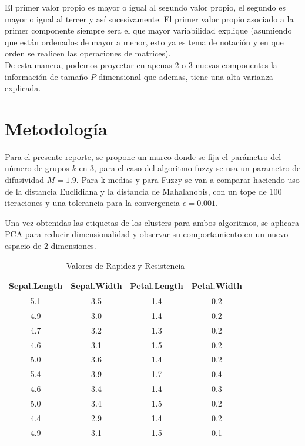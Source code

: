 \documentclass[11pt, letterpaper]{article}
\begin{document}
El primer valor propio es mayor o igual al segundo valor propio, el segundo es mayor o igual al tercer y así sucesivamente. El primer valor propio asociado a la primer componente siempre sera el que mayor variabilidad explique (asumiendo que están ordenados de mayor a menor, esto ya es tema de notación y en que orden se realicen las operaciones de matrices). \\

De esta manera, podemos proyectar en apenas 2 o 3 nuevas componentes la información de tamaño $P$ dimensional que ademas, tiene una alta varianza explicada.




\newpage

\section{Metodología}

Para el presente reporte, se propone un marco donde se fija el parámetro del número de grupos $k$ en 3, para el caso del algoritmo fuzzy se usa un parametro de difusividad $M = 1.9$. Para k-medias y para Fuzzy se van a comparar haciendo uso de la distancia Euclidiana y la distancia de Mahalanobis, con un tope de 100 iteraciones y una tolerancia para la convergencia $\epsilon = 0.001$.

Una vez obtenidas las etiquetas de los clusters para ambos algoritmos, se aplicara PCA para reducir dimensionalidad y observar su comportamiento en un nuevo espacio de 2 dimensiones.






\begin{table}[ht]
	\centering
	\begin{tabular}{cccc}
		\hline
\textbf{Sepal.Length} & \textbf{Sepal.Width} & \textbf{Petal.Length} & \textbf{Petal.Width} \\
		\hline

5.1          & 3.5         & 1.4          & 0.2 \\
4.9          & 3.0         & 1.4          & 0.2  \\        
4.7          & 3.2         & 1.3          & 0.2  \\       
4.6          & 3.1         & 1.5          & 0.2  \\       
5.0          & 3.6         & 1.4          & 0.2    \\     
5.4          & 3.9         & 1.7          & 0.4      \\     
4.6          & 3.4         & 1.4          & 0.3        \\   
5.0          & 3.4         & 1.5          & 0.2          \\ 
4.4          & 2.9         & 1.4          & 0.2           \\
4.9          & 3.1         & 1.5          & 0.1          \\
	\end{tabular}
	\caption{Valores de Rapidez y Resistencia}
	\label{tab:rapidez_resistencia}
\end{table}
\end{document}
